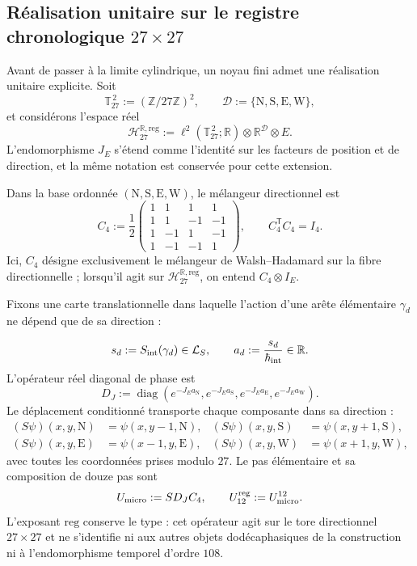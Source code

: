 \subsection{Réalisation unitaire sur le registre chronologique
\texorpdfstring{\(27\times27\)}{27 x 27}}
\label{sec:realizacion-unitaria-registro-27-rev3}

Avant de passer à la limite cylindrique, un noyau fini admet une réalisation
unitaire explicite. Soit
\[
 \mathbb T_{27}^{\,2}:=(\mathbb Z/27\mathbb Z)^2,
 \qquad
 \mathcal D:=\{\mathrm N,\mathrm S,\mathrm E,\mathrm W\},
\]
et considérons l’espace réel
\[
 \mathcal H_{27}^{\mathbb R,\mathrm{reg}}
 :=\ell^2(\mathbb T_{27}^{\,2};\mathbb R)
   \otimes\mathbb R^{\mathcal D}\otimes E.
\]
L'endomorphisme \(J_E\) s'étend comme l'identité sur les facteurs de position et de direction, et la même notation est conservée pour cette extension.

Dans la base ordonnée
\((\mathrm N,\mathrm S,\mathrm E,\mathrm W)\), le mélangeur directionnel est
\begin{equation}
 C_4:=\frac12
 \begin{pmatrix}
  1&1&1&1\\
  1&1&-1&-1\\
  1&-1&1&-1\\
  1&-1&-1&1
 \end{pmatrix},
 \qquad C_4^{\mathsf T}C_4=I_4.
 \label{eq:mezclador-walsh-registro-27-rev3}
\end{equation}
Ici, \(C_4\) désigne exclusivement le mélangeur de Walsh--Hadamard sur la
fibre directionnelle ; lorsqu’il agit sur
\(\mathcal H_{27}^{\mathbb R,\mathrm{reg}}\), on entend
\(C_4\otimes I_E\).

Fixons une carte translationnelle dans laquelle l’action d’une arête élémentaire
\(\gamma_d\) ne dépend que de sa direction :

\[
 s_d:=S_{\rm int}(\gamma_d)\in\mathcal L_S,
 \qquad
 a_d:=\frac{s_d}{\hbar_{\rm int}}\in\mathbb R.
\]
L’opérateur réel diagonal de phase est
\[
 D_J:=\operatorname{diag}
 \left(
  e^{-J_Ea_{\mathrm N}},
  e^{-J_Ea_{\mathrm S}},
  e^{-J_Ea_{\mathrm E}},
  e^{-J_Ea_{\mathrm W}}
 \right).
\]
Le déplacement conditionné transporte chaque composante dans sa direction :
\begin{align*}
 (S\psi)(x,y,\mathrm N)&=\psi(x,y-1,\mathrm N),&
 (S\psi)(x,y,\mathrm S)&=\psi(x,y+1,\mathrm S),\\
 (S\psi)(x,y,\mathrm E)&=\psi(x-1,y,\mathrm E),&
 (S\psi)(x,y,\mathrm W)&=\psi(x+1,y,\mathrm W),
\end{align*}
avec toutes les coordonnées prises modulo \(27\). Le pas élémentaire et sa
composition de douze pas sont
\begin{equation}
 U_{\rm micro}:=S D_J C_4,
 \qquad
 U_{12}^{\mathrm{reg}}:=U_{\rm micro}^{12}.
 \label{eq:paso-unitario-registro-27-rev3}
\end{equation}
L’exposant \(\mathrm{reg}\) conserve le type : cet opérateur agit sur
le tore directionnel \(27\times27\) et ne s’identifie ni aux autres objets
dodécaphasiques de la construction ni à l’endomorphisme temporel d’ordre \(108\).

